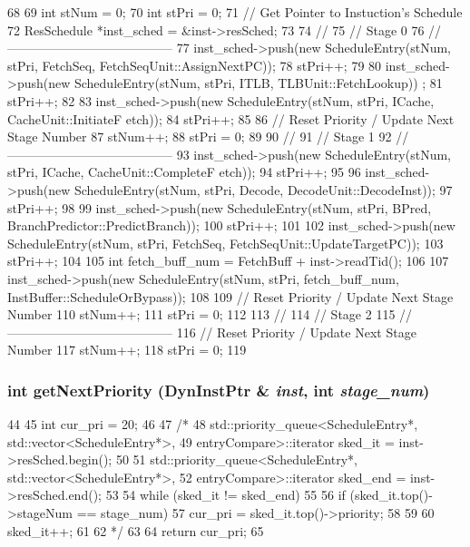 \begin{DoxyCode}
68 {
69     int stNum = 0;
70     int stPri = 0;
71     // Get Pointer to Instuction's Schedule
72     ResSchedule *inst_sched = &inst->resSched;
73 
74     //
75     // Stage 0
76     // ---------------------------------------
77     inst_sched->push(new ScheduleEntry(stNum, stPri, FetchSeq, 
      FetchSeqUnit::AssignNextPC));
78     stPri++;
79 
80     inst_sched->push(new ScheduleEntry(stNum, stPri, ITLB, TLBUnit::FetchLookup))
      ;
81     stPri++;
82 
83     inst_sched->push(new ScheduleEntry(stNum, stPri, ICache, CacheUnit::InitiateF
      etch));
84     stPri++;
85 
86     // Reset Priority / Update Next Stage Number
87     stNum++;
88     stPri = 0;
89 
90     //
91     // Stage 1
92     // ---------------------------------------
93     inst_sched->push(new ScheduleEntry(stNum, stPri, ICache, CacheUnit::CompleteF
      etch));
94     stPri++;
95 
96     inst_sched->push(new ScheduleEntry(stNum, stPri, Decode, 
      DecodeUnit::DecodeInst));
97     stPri++;
98 
99     inst_sched->push(new ScheduleEntry(stNum, stPri, BPred, 
      BranchPredictor::PredictBranch));
100     stPri++;
101 
102     inst_sched->push(new ScheduleEntry(stNum, stPri, FetchSeq, 
      FetchSeqUnit::UpdateTargetPC));
103     stPri++;
104 
105     int fetch_buff_num = FetchBuff + inst->readTid();
106 
107     inst_sched->push(new ScheduleEntry(stNum, stPri, fetch_buff_num, 
      InstBuffer::ScheduleOrBypass));
108 
109     // Reset Priority / Update Next Stage Number
110     stNum++;
111     stPri = 0;
112 
113     //
114     // Stage 2
115     // ---------------------------------------
116     // Reset Priority / Update Next Stage Number
117     stNum++;
118     stPri = 0;
119 }
\end{DoxyCode}
\hypertarget{namespaceThePipeline_ac700a8f16a36e0276ea60791d35dbcc2}{
\subsubsection[{getNextPriority}]{\setlength{\rightskip}{0pt plus 5cm}int getNextPriority (DynInstPtr \& {\em inst}, \/  int {\em stage\_\-num})}}
\label{namespaceThePipeline_ac700a8f16a36e0276ea60791d35dbcc2}



\begin{DoxyCode}
44 {
45     int cur_pri = 20;
46 
47     /*
48     std::priority_queue<ScheduleEntry*, std::vector<ScheduleEntry*>,
49         entryCompare>::iterator sked_it = inst->resSched.begin();
50 
51     std::priority_queue<ScheduleEntry*, std::vector<ScheduleEntry*>,
52         entryCompare>::iterator sked_end = inst->resSched.end();
53 
54     while (sked_it != sked_end) {
55 
56         if (sked_it.top()->stageNum == stage_num) {
57             cur_pri = sked_it.top()->priority;
58         }
59 
60         sked_it++;
61     }
62     */
63 
64     return cur_pri;
65 }
\end{DoxyCode}


